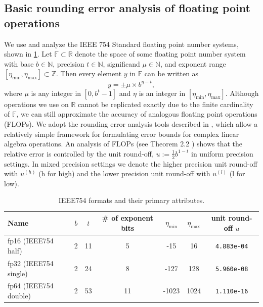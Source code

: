 \documentclass[review,onefignum,onetabnum]{siamart190516}
\newcommand{\R}{\mathbb{R}}
\newcommand{\F}{\mathbb{F}}
\begin{document}
\subsection{Basic rounding error analysis of floating point operations}\label{sec:backgroundRE}
We use and analyze the IEEE 754 Standard floating point number systems, shown in \cref{table:ieee}.
Let $\F \subset \R$ denote the space of some floating point number system with base $b\in\mathbb{N}$, precision $t\in\mathbb{N}$, significand $\mu\in\mathbb{N}$, and exponent range $[\eta_{\text{min}}, \eta_{\text{max}}]\subset \mathbb{Z}$.
Then every element $y$ in $\F$ can be written as 
\begin{equation}
y = \pm \mu\times b^{\eta-t},
\label{eqn:FPbasic}
\end{equation} 
where $\mu$ is any integer in $[0,b^{t}-1]$ and $\eta$ is an integer in  $[\eta_{\text{min}}, \eta_{\text{max}}]$.
Although operations we use on $\R$ cannot be replicated exactly due to the finite cardinality of $\F$, we can still approximate the accuracy of analogous floating point operations (FLOPs).
We adopt the rounding error analysis tools described in \cite{Higham2002}, which allow a relatively simple framework for formulating error bounds for complex linear algebra operations. 
An analysis of FLOPs (see Theorem 2.2 \cite{Higham2002}) shows that the relative error is 
controlled by the unit round-off, $u:=\frac{1}{2}b^{1-t}$ in uniform precision settings. 
In mixed precision settings we denote the higher precision unit round-off with $u^{(h)}$ (h for high) and the lower precision unit round-off with $u^{(l)}$ (l for low).\par 
\vspace{-.3cm}
\begin{table}[H]
	\begin{tabular}{||l|c|c|c|c|c|c||} 
		\hline 
		Name & $b$ & $t$ & \# of exponent bits & $\eta_{\text{min}}$ & $\eta_{\text{max}}$ & unit round-off $u$ \\ \hline 
		fp16 (IEEE754 half)& 2 & 11 & 5 & -15 & 16  & {\tt 4.883e-04} \\ \hline 
		fp32 (IEEE754 single)& 2 & 24 & 8 & -127 & 128  & {\tt 5.960e-08} \\ \hline 
		fp64 (IEEE754 double)& 2 & 53 & 11 & -1023 & 1024 & {\tt 1.110e-16} \\ \hline 
	\end{tabular}
	\caption{IEEE754 formats and their primary attributes.} %
	\label{table:ieee}
\end{table}
\vspace{-.8cm}
\end{document}
